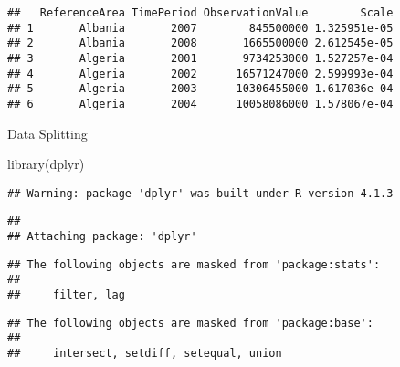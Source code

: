 \documentclass[
]{article}
\newenvironment{Shaded}{\begin{snugshade}}{\end{snugshade}}
\newcommand{\FunctionTok}[1]{\textcolor[rgb]{0.00,0.00,0.00}{#1}}
\newcommand{\NormalTok}[1]{#1}
\begin{document}
\begin{verbatim}
##   ReferenceArea TimePeriod ObservationValue        Scale
## 1       Albania       2007        845500000 1.325951e-05
## 2       Albania       2008       1665500000 2.612545e-05
## 3       Algeria       2001       9734253000 1.527257e-04
## 4       Algeria       2002      16571247000 2.599993e-04
## 5       Algeria       2003      10306455000 1.617036e-04
## 6       Algeria       2004      10058086000 1.578067e-04
\end{verbatim}

Data Splitting

\begin{Shaded}
\begin{Highlighting}[]
\FunctionTok{library}\NormalTok{(dplyr)}
\end{Highlighting}
\end{Shaded}

\begin{verbatim}
## Warning: package 'dplyr' was built under R version 4.1.3
\end{verbatim}

\begin{verbatim}
## 
## Attaching package: 'dplyr'
\end{verbatim}

\begin{verbatim}
## The following objects are masked from 'package:stats':
## 
##     filter, lag
\end{verbatim}

\begin{verbatim}
## The following objects are masked from 'package:base':
## 
##     intersect, setdiff, setequal, union
\end{verbatim}
\end{document}

